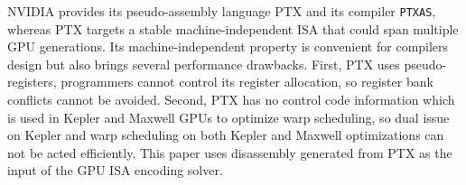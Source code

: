 NVIDIA provides its pseudo-assembly language PTX and its compiler {\tt PTXAS}, whereas PTX targets a stable machine-independent ISA that could span multiple GPU generations.
Its machine-independent property is convenient for compilers design but also brings several performance drawbacks.
First, PTX uses pseudo-registers, programmers cannot control its register allocation, so register bank conflicts cannot be avoided. 
Second, PTX has no control code information which is used in Kepler and Maxwell
GPUs to optimize warp scheduling, so dual issue on Kepler and warp scheduling on both Kepler and Maxwell
optimizations can not be acted efficiently.
This paper uses disassembly generated from PTX as the input of the GPU ISA encoding solver.
